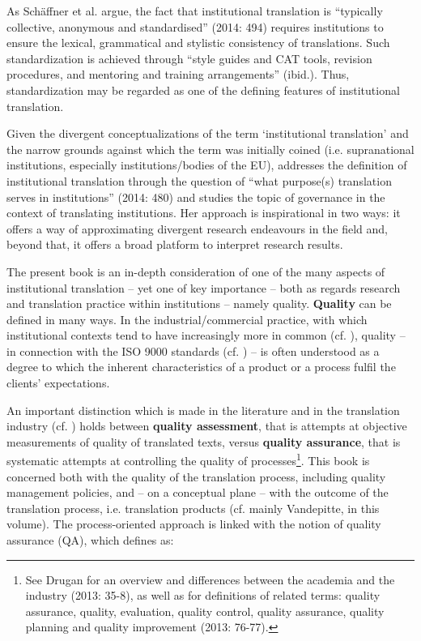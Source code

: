 \documentclass[output=paper]{langsci/langscibook}
\begin{document}
As Schäffner et al. argue, the fact that institutional translation is “typically collective, anonymous and standardised” (2014: 494) requires institutions to ensure the lexical, grammatical and stylistic consistency of translations. Such standardization is achieved through “style guides and CAT tools, revision procedures, and mentoring and training arrangements” (ibid.). Thus, standardization may be regarded as one of the defining features of institutional translation.

Given the divergent conceptualizations of the term ‘institutional translation’ and the narrow grounds against which the term was initially coined (i.e. supranational institutions, especially institutions/bodies of the EU), \citet{Koskinen2014} addresses the definition of institutional translation through the question of “what purpose(s) translation serves in institutions” (2014: 480) and studies the topic of governance in the context of translating institutions. Her approach is inspirational in two ways: it offers a way of approximating divergent research endeavours in the field and, beyond that, it offers a broad platform to interpret research results. 

The present book is an in-depth consideration of one of the many aspects of institutional translation – yet one of key importance – both as regards research and translation practice within institutions – namely quality. \textbf{Quality} can be defined in many ways. In the industrial/commercial practice, with which institutional contexts tend to have increasingly more in common (cf. \citealt{Mossop2006}), quality – in connection with the ISO 9000 standards (cf. \citealt{ISO2015b}) – is often understood as a degree to which the inherent characteristics of a product or a process fulfil the clients’ expectations. 

An important distinction which is made in the literature and in the translation industry (cf. \citealt{Drugan2013}) holds between \textbf{quality assessment}, that is attempts at objective measurements of quality of translated texts, versus \textbf{quality assurance}, that is systematic attempts at controlling the quality of processes\footnote{See Drugan for an overview and differences between the academia and the industry (2013: 35-8), as well as for definitions of related terms: quality assurance, quality, evaluation, quality control, quality assurance, quality planning and quality improvement (2013: 76-77).}. This book is concerned both with the quality of the translation process, including quality management policies, and – on a conceptual plane – with the outcome of the translation process, i.e. translation products (cf. mainly Vandepitte, in this volume). The process-oriented approach is linked with the notion of quality assurance (QA), which \citet{Mossop2001} defines as:
\end{document}
